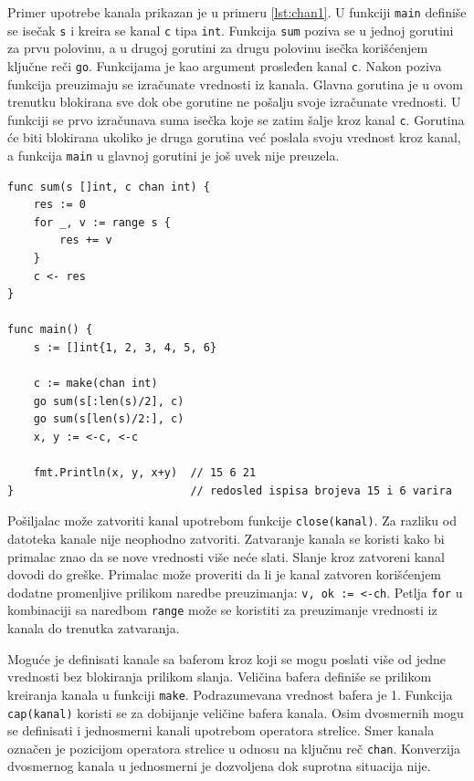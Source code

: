 \documentclass[12pt,oneside]{memoir}
\begin{document}
Primer upotrebe kanala prikazan je u primeru \ref{lst:chan1}. U funkciji \texttt{main} definiše se isečak \texttt{s} i kreira se kanal \texttt{c} tipa \texttt{int}. Funkcija \texttt{sum}  poziva se u jednoj gorutini za prvu polovinu, a u drugoj gorutini za drugu polovinu isečka korišćenjem  ključne reči \texttt{go}. Funkcijama je kao argument prosleđen kanal \texttt{c}. Nakon poziva funkcija preuzimaju se izračunate vrednosti iz kanala. Glavna gorutina je u ovom trenutku blokirana sve dok obe gorutine ne pošalju svoje izračunate vrednosti. U funkciji se prvo izračunava suma isečka koje se zatim šalje kroz kanal \texttt{c}. Gorutina će biti blokirana ukoliko je druga gorutina već poslala svoju vrednost kroz kanal, a  funkcija \texttt{main} u glavnoj gorutini je još uvek nije preuzela. 

\begin{center}
\begin{lstlisting}[caption=Primer upotrebe kanala, label={lst:chan1},  backgroundcolor=\color{background}]
func sum(s []int, c chan int) {
	res := 0
	for _, v := range s {
		res += v
	}
	c <- res 
}

func main() {
	s := []int{1, 2, 3, 4, 5, 6}

	c := make(chan int)
	go sum(s[:len(s)/2], c)
	go sum(s[len(s)/2:], c)
	x, y := <-c, <-c 

	fmt.Println(x, y, x+y)	// 15 6 21 
}							// redosled ispisa brojeva 15 i 6 varira
\end{lstlisting}
\end{center}

Pošiljalac može zatvoriti kanal upotrebom funkcije \texttt{close(kanal)}. Za razliku od datoteka kanale nije neophodno zatvoriti. Zatvaranje kanala se koristi kako bi primalac znao da se nove vrednosti više neće slati. Slanje kroz zatvoreni kanal dovodi do greške. Primalac može proveriti da li je kanal zatvoren korišćenjem dodatne promenljive prilikom naredbe preuzimanja: \texttt{v, ok := <-ch}. Petlja \texttt{for} u kombinaciji sa naredbom \texttt{range} može se koristiti za preuzimanje vrednosti iz kanala do trenutka zatvaranja. 

Moguće je definisati kanale sa baferom kroz koji se mogu poslati više od jedne vrednosti bez blokiranja prilikom slanja. Veličina bafera definiše se prilikom kreiranja kanala u funkciji \texttt{make}. Podrazumevana vrednost bafera je 1. Funkcija \texttt{cap(kanal)} koristi se za dobijanje veličine bafera kanala. Osim dvosmernih mogu se definisati i jednosmerni kanali upotrebom operatora strelice. Smer kanala označen je pozicijom operatora strelice u odnosu na ključnu reč \texttt{chan}. Konverzija dvosmernog kanala u jednosmerni je dozvoljena dok suprotna situacija nije. 
\end{document}
